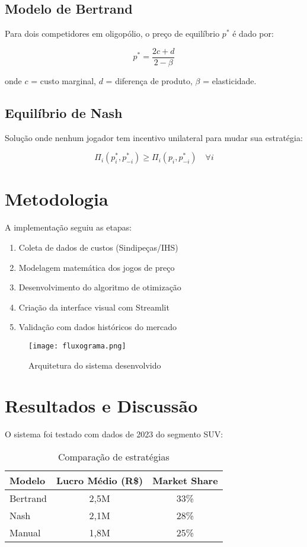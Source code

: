 \documentclass[12pt]{article}
\begin{document}
\subsection{Modelo de Bertrand}
Para dois competidores em oligopólio, o preço de equilíbrio \(p^*\) é dado por:

\begin{equation}
p^* = \frac{2c + d}{2 - \beta}
\end{equation}

onde \(c\) = custo marginal, \(d\) = diferença de produto, \(\beta\) = elasticidade.

\subsection{Equilíbrio de Nash}
Solução onde nenhum jogador tem incentivo unilateral para mudar sua estratégia:

\begin{equation}
\Pi_i(p_i^*, p_{-i}^*) \geq \Pi_i(p_i, p_{-i}^*) \quad \forall i
\end{equation}

\section{Metodologia}
A implementação seguiu as etapas:

\begin{enumerate}
\item Coleta de dados de custos (Sindipeças/IHS)
\item Modelagem matemática dos jogos de preço
\item Desenvolvimento do algoritmo de otimização
\item Criação da interface visual com Streamlit
\item Validação com dados históricos do mercado
\end{enumerate}

\begin{figure}[ht]
\centering
\texttt{[image: fluxograma.png]}
\caption{Arquitetura do sistema desenvolvido}
\label{fig:fluxo}
\end{figure}

\section{Resultados e Discussão}
O sistema foi testado com dados de 2023 do segmento SUV:

\begin{table}[ht]
\centering
\caption{Comparação de estratégias}
\begin{tabular}{|l|c|c|}
\hline
Modelo & Lucro Médio (R\$) & Market Share \\ \hline
Bertrand & 2,5M & 33\% \\ 
Nash & 2,1M & 28\% \\
Manual & 1,8M & 25\% \\ \hline
\end{tabular}
\end{table}
\end{document}
